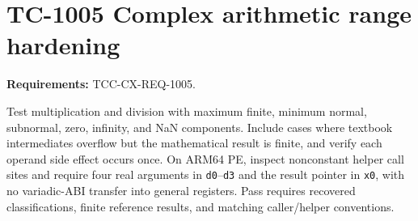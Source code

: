 \documentclass{article}
\begin{document}
\section*{TC-1005 Complex arithmetic range hardening}
\textbf{Requirements:} TCC-CX-REQ-1005.

Test multiplication and division with maximum finite, minimum normal,
subnormal, zero, infinity, and NaN components. Include cases where textbook
intermediates overflow but the mathematical result is finite, and verify each
operand side effect occurs once. On ARM64 PE, inspect nonconstant helper call
sites and require four real arguments in \texttt{d0}--\texttt{d3} and the
result pointer in \texttt{x0}, with no variadic-ABI transfer into general
registers. Pass requires recovered classifications, finite reference results,
and matching caller/helper conventions.
\end{document}
